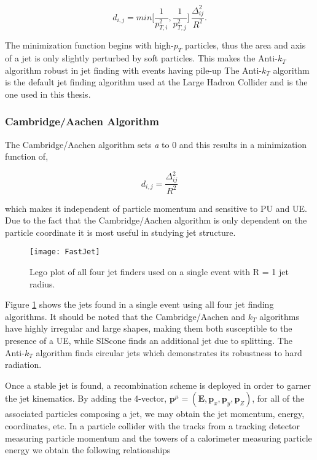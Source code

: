 \begin{equation}
d_{i,j} = min \Bigg [\frac{1}{p^{2}_{T,i}}, \frac{1}{p^{2}_{T,j}} \Bigg ] \, \frac{\Delta^{2}_{ij}}{R^{2}}.
\label{eq:Akt}
\end{equation}

The minimization function begins with high-$p_{T}$ particles, thus the area and axis of a jet is only slightly perturbed by soft particles.  This makes the Anti-$k_{T}$ algorithm robust in jet finding with events having pile-up  The Anti-$k_{T}$ algorithm is the default jet finding algorithm used at the Large Hadron Collider and is the one used in this thesis.

\subsubsection{Cambridge/Aachen Algorithm}

The Cambridge/Aachen algorithm sets \textit{a} to 0 and this results in a minimization function of,

\begin{equation}
d_{i,j} = \frac{\Delta^{2}_{ij}}{R^{2}}
\label{eq:CBalg}
\end{equation}

\noindent
which makes it independent of particle momentum and sensitive to PU and UE.  Due to the fact that the Cambridge/Aachen algorithm is only dependent on the particle coordinate it is most useful in studying jet structure.

\begin{figure}[h]
\texttt{[image: FastJet]}
\centering
\caption{Lego plot of all four jet finders used on a single event with R = 1 jet radius\cite{Atkin:2015msa}.}
\label{fig:AllJetFinder}
\end{figure}

Figure \ref{fig:AllJetFinder} shows the jets found in a single event using all four jet finding algorithms.  It should be noted that the Cambridge/Aachen and $k_{T}$ algorithms have highly irregular and large shapes, making them both susceptible to the presence of a UE, while SIScone finds an additional jet due to splitting.  The Anti-$k_{T}$ algorithm finds circular jets which demonstrates its robustness to hard radiation.  

Once a stable jet is found, a recombination scheme is deployed in order to garner the jet kinematics.  By adding the 4-vector, $\boldsymbol{p}^{\mu} = (\boldsymbol{E},\boldsymbol{p}_{x},\boldsymbol{p}_{y},\boldsymbol{p}_{Z})$, for all of the associated particles composing a jet, we may obtain the jet momentum, energy, coordinates, etc.  In a particle collider with the tracks from a tracking detector measuring particle momentum and the towers of a calorimeter measuring particle energy we obtain the following relationships



